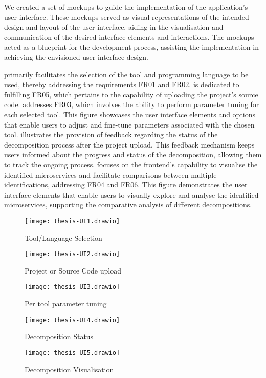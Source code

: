 We created a set of mockups to guide the implementation of the application's
user interface. These mockups served as visual representations of the intended
design and layout of the user interface, aiding in the visualisation and
communication of the desired interface elements and interactions. The mockups
acted as a blueprint for the development process, assisting the implementation
in achieving the envisioned user interface design.

 primarily facilitates the selection
of the tool and programming language to be used, thereby addressing the
requirements FR01 and FR02.  is
dedicated to fulfilling FR05, which pertains to the capability of uploading the
project's source code.  addresses FR03,
which involves the ability to perform parameter tuning for each selected tool.
This figure showcases the user interface elements and options that enable users
to adjust and fine-tune parameters associated with the chosen tool.
 illustrates the provision of feedback
regarding the status of the decomposition process after the project upload.
This feedback mechanism keeps users informed about the progress and status of
the decomposition, allowing them to track the ongoing process.
 focuses on the frontend's
capability to visualise the identified microservices and facilitate comparisons
between multiple identifications, addressing FR04 and FR06. This figure
demonstrates the user interface elements that enable users to visually explore
and analyse the identified microservices, supporting the comparative analysis
of different decompositions.

\begin{figure*}[!htb]
  \caption{Tool/Language Selection}
  \label{fig:mockup-tool-language-selection}
  \centering
  \texttt{[image: thesis-UI1.drawio]}
\end{figure*}

\begin{figure*}[!htb]
  \caption{Project or Source Code upload}
  \label{fig:mockup-project-source-code-upload}
  \centering
  \texttt{[image: thesis-UI2.drawio]}
\end{figure*}

\begin{figure*}[!htb]
  \caption{Per tool parameter tuning}
  \label{fig:mockup-tool-parameter-tuning}
  \centering
  \texttt{[image: thesis-UI3.drawio]}
\end{figure*}

\begin{figure*}[!htb]
  \caption{Decomposition Status}
  \label{fig:mockup-decomposition-status}
  \centering
  \texttt{[image: thesis-UI4.drawio]}
\end{figure*}

\begin{figure*}[!htb]
  \caption{Decomposition Visualisation}
  \label{fig:mockup-decomposition-visualisation}
  \centering
  \texttt{[image: thesis-UI5.drawio]}
\end{figure*}
